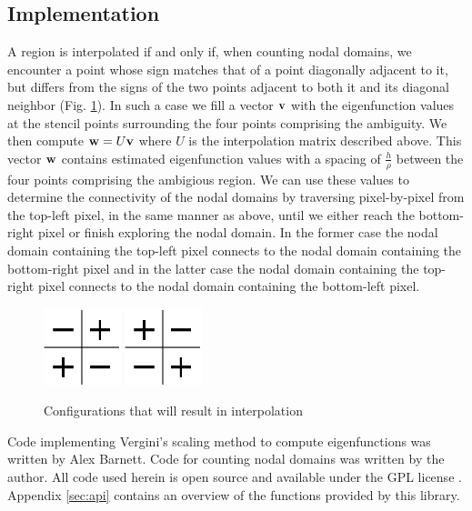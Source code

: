 \documentclass{report}
\begin{document}
\subsection{Implementation}
A region is interpolated if and only if, when counting nodal domains, we encounter a point whose sign matches that of a point diagonally adjacent to it, but differs from the signs of the two points adjacent to both it and its diagonal neighbor (Fig. \ref{fig:trouble_spot}). In such a case we fill a vector ${\bf v}$ with the eigenfunction values at the stencil points surrounding the four points comprising the ambiguity. We then compute ${\bf w} = U {\bf v}$ where $U$ is the interpolation matrix described above. This vector ${\bf w}$ contains estimated eigenfunction values with a spacing of $\frac{h}{\rho}$ between the four points comprising the ambigious region. We can use these values to determine the connectivity of the nodal domains by traversing pixel-by-pixel from the top-left pixel, in the same manner as above, until we either reach the bottom-right pixel or finish exploring the nodal domain. In the former case the nodal domain containing the top-left pixel connects to the nodal domain containing the bottom-right pixel and in the latter case the nodal domain containing the top-right pixel connects to the nodal domain containing the bottom-left pixel.

\begin{figure}
  \begin{center}
    \includegraphics[width=0.2\textwidth]{figs/interpolation/trouble_spot1.eps}
    \hspace{1 cm} 
    \includegraphics[width=0.2\textwidth]{figs/interpolation/trouble_spot2.eps}
    \caption{Configurations that will result in interpolation}
    \label{fig:trouble_spot}
  \end{center}
\end{figure}

Code implementing Vergini's scaling method to compute eigenfunctions was written by Alex Barnett. Code for counting nodal domains was written by the author. All code used herein is open source and available under the GPL license \cite{gpl} \cite{github}. Appendix \ref{sec:api} contains an overview of the functions provided by this library.
\end{document}
